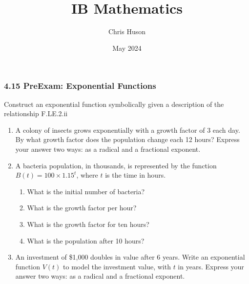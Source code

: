 \documentclass[12pt, twoside]{article}
\title{IB Mathematics}
\author{Chris Huson}
\date{May 2024}
\begin{document}
\subsubsection*{4.15 PreExam: Exponential Functions}
Construct an exponential function symbolically given a description of the relationship \hfill F.LE.2.ii

\begin{enumerate}
\item A colony of insects grows exponentially with a growth factor of $3$ each day. By what growth factor does the population change each 12 hours? Express your answer two ways: as a radical and a fractional exponent. \vspace{2cm}
\item A bacteria population, in thousands, is represented by the function $B(t)=100 \times 1.15^t$, where $t$ is the time in hours.
\begin{enumerate}
    \item What is the initial number of bacteria? \vspace{1cm}
    \item What is the growth factor per hour? \vspace{1cm}
    \item What is the growth factor for ten hours? \vspace{2cm}
    \item What is the population after 10 hours? \vspace{2cm}
\end{enumerate}

\item An investment of \$1,000 doubles in value after 6 years. Write an exponential function $V(t)$ to model the investment value, with $t$ in years. Express your answer two ways: as a radical and a fractional exponent.


\end{enumerate}
\end{document}
